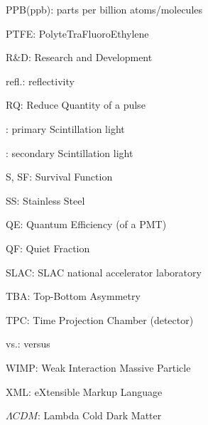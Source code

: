 PPB(ppb): parts per billion atoms/molecules

PTFE: PolyteTraFluoroEthylene

R\&D: Research and Development

refl.: reflectivity

RQ: Reduce Quantity of a pulse

\sone : primary Scintillation light

\stwo : secondary Scintillation light

S, SF: Survival Function

SS: Stainless Steel

QE: Quantum Efficiency (of a PMT)

QF: Quiet Fraction

SLAC: SLAC national accelerator laboratory

TBA: Top-Bottom Asymmetry

TPC: Time Projection Chamber (detector)

vs.: versus

WIMP: Weak Interaction Massive Particle

XML: eXtensible Markup Language 

$\Lambda CDM$: Lambda Cold Dark Matter
